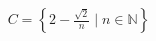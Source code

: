 \documentclass[preview]{standalone}
\begin{document}
\begin{align*}
C = \left\{ 2 - \frac{\sqrt{2}}{n} \mid n \in \mathbb{N} \right\}
\end{align*}
\end{document}
